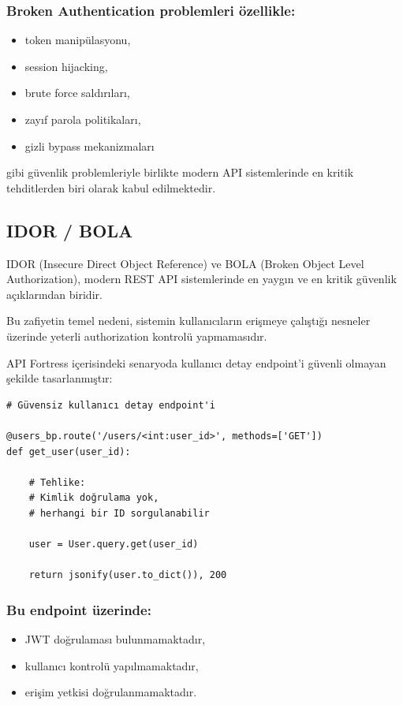 \subsubsection{Broken Authentication problemleri özellikle:}

\begin{itemize}[leftmargin=*]
    \item token manipülasyonu,
    \item session hijacking,
    \item brute force saldırıları,
    \item zayıf parola politikaları,
    \item gizli bypass mekanizmaları
\end{itemize}

gibi güvenlik problemleriyle birlikte modern API sistemlerinde en kritik tehditlerden biri olarak kabul edilmektedir.

\subsection{IDOR / BOLA}
\label{idor-bola}

IDOR (Insecure Direct Object Reference) ve BOLA (Broken Object Level Authorization), modern REST API sistemlerinde en yaygın ve en kritik güvenlik açıklarından biridir.

Bu zafiyetin temel nedeni, sistemin kullanıcıların erişmeye çalıştığı nesneler üzerinde yeterli authorization kontrolü yapmamasıdır.

API Fortress içerisindeki senaryoda kullanıcı detay endpoint’i güvenli olmayan şekilde tasarlanmıştır:

\begin{lstlisting}
# Güvensiz kullanıcı detay endpoint'i

@users_bp.route('/users/<int:user_id>', methods=['GET'])
def get_user(user_id):

    # Tehlike:
    # Kimlik doğrulama yok,
    # herhangi bir ID sorgulanabilir

    user = User.query.get(user_id)

    return jsonify(user.to_dict()), 200
\end{lstlisting}

\subsubsection{Bu endpoint üzerinde:}

\begin{itemize}[leftmargin=*]
    \item JWT doğrulaması bulunmamaktadır,
    \item kullanıcı kontrolü yapılmamaktadır,
    \item erişim yetkisi doğrulanmamaktadır.
\end{itemize}

